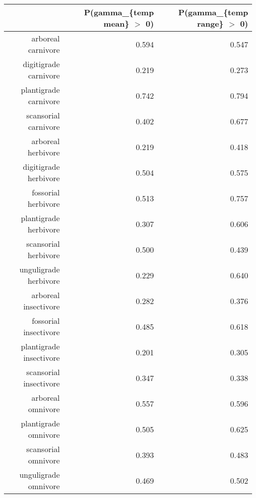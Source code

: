 \begin{table}[ht]
\centering
\begin{tabular}{rrr}
  \hline
 & P(gamma\_\{temp mean\} $>$ 0) & P(gamma\_\{temp range\} $>$ 0) \\ 
  \hline
arboreal carnivore & 0.594 & 0.547 \\ 
  digitigrade carnivore & 0.219 & 0.273 \\ 
  plantigrade carnivore & 0.742 & 0.794 \\ 
  scansorial carnivore & 0.402 & 0.677 \\ 
  arboreal herbivore & 0.219 & 0.418 \\ 
  digitigrade herbivore & 0.504 & 0.575 \\ 
  fossorial herbivore & 0.513 & 0.757 \\ 
  plantigrade herbivore & 0.307 & 0.606 \\ 
  scansorial herbivore & 0.500 & 0.439 \\ 
  unguligrade herbivore & 0.229 & 0.640 \\ 
  arboreal insectivore & 0.282 & 0.376 \\ 
  fossorial insectivore & 0.485 & 0.618 \\ 
  plantigrade insectivore & 0.201 & 0.305 \\ 
  scansorial insectivore & 0.347 & 0.338 \\ 
  arboreal omnivore & 0.557 & 0.596 \\ 
  plantigrade omnivore & 0.505 & 0.625 \\ 
  scansorial omnivore & 0.393 & 0.483 \\ 
  unguligrade omnivore & 0.469 & 0.502 \\ 
   \hline
\end{tabular}
\label{tab:surv_temp}
\end{table}
